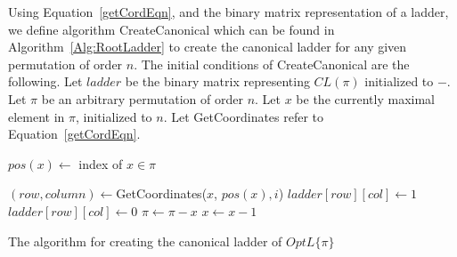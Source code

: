 Using Equation~\ref{getCordEqn}, and the binary matrix representation 
of a ladder, we define algorithm {\sc CreateCanonical} which can be found 
in Algorithm~\ref{Alg:RootLadder} to create the canonical ladder for 
any given permutation of order $n$. 
The initial conditions of {\sc CreateCanonical} are the 
following. Let $ladder$ be the binary matrix representing $CL(\pi)$ initialized to $-$. Let $\pi$ be an arbitrary permutation 
of order $n$. Let $x$ be the currently maximal element in $\pi$, initialized to $n$. Let {\sc GetCoordinates} refer to 
Equation~\ref{getCordEqn}. 
\begin{algorithm}[ht]
	\begin{algorithmic}[1]
                \State $pos(x) \gets $ index of $x \in \pi$
                        
                        \State $(row, column) \gets${\sc GetCoordinates($x$, $pos(x), i$)}
                            \State $ladder[row][col] \gets 1$
                        \Else
                            \State $ladder[row][col] \gets 0$
                        \EndIf
                    \EndIf
                \EndFor
                \State $\pi \gets \pi - x$
                \State $x \gets x-1$
            \EndWhile
        \EndFunction

	\end{algorithmic}
	\caption{The algorithm for creating the canonical ladder of $OptL\{\pi\}$}
	\label{Alg:RootLadder}
\end{algorithm}

